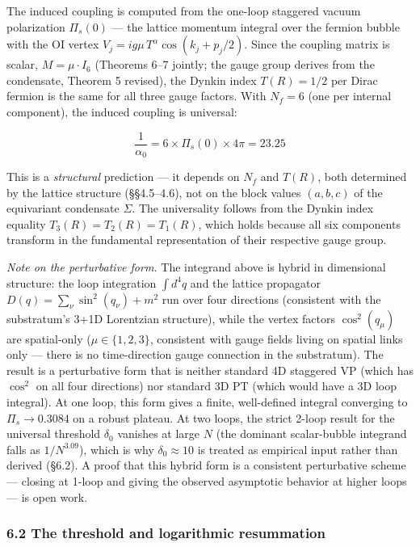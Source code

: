 \documentclass[
]{article}
\begin{document}
The induced coupling is computed from the one-loop staggered vacuum
polarization \(\Pi_s(0)\) --- the lattice momentum integral over the
fermion bubble with the OI vertex
\(V_j = i g \mu \, T^\alpha \cos(k_j + p_j/2)\). Since the coupling
matrix is scalar, \(M = \mu \cdot I_6\) (Theorems 6--7 jointly; the
gauge group derives from the condensate, Theorem 5 revised), the Dynkin
index \(T(R) = 1/2\) per Dirac fermion is the same for all three gauge
factors. With \(N_f = 6\) (one per internal component), the induced
coupling is universal:

\[\frac{1}{\alpha_0} = 6 \times \Pi_s(0) \times 4\pi = 23.25\]

This is a \emph{structural} prediction --- it depends on \(N_f\) and
\(T(R)\), both determined by the lattice structure (§§4.5--4.6), not on
the block values \((a, b, c)\) of the equivariant condensate \(\Sigma\).
The universality follows from the Dynkin index equality
\(T_3(R) = T_2(R) = T_1(R)\), which holds because all six components
transform in the fundamental representation of their respective gauge
group.

\emph{Note on the perturbative form.} The integrand above is hybrid in
dimensional structure: the loop integration \(\int d^4q\) and the
lattice propagator \(D(q) = \sum_\nu \sin^2(q_\nu) + m^2\) run over four
directions (consistent with the substratum's 3+1D Lorentzian structure),
while the vertex factors \(\cos^2(q_\mu)\) are spatial-only
(\(\mu \in \{1,2,3\}\), consistent with gauge fields living on spatial
links only --- there is no time-direction gauge connection in the
substratum). The result is a perturbative form that is neither standard
4D staggered VP (which has \(\cos^2\) on all four directions) nor
standard 3D PT (which would have a 3D loop integral). At one loop, this
form gives a finite, well-defined integral converging to
\(\Pi_s \to 0.3084\) on a robust plateau. At two loops, the strict
2-loop result for the universal threshold \(\delta_0\) vanishes at large
\(N\) (the dominant scalar-bubble integrand falls as \(1/N^{3.09}\)),
which is why \(\delta_0 \approx 10\) is treated as empirical input
rather than derived (§6.2). A proof that this hybrid form is a
consistent perturbative scheme --- closing at 1-loop and giving the
observed asymptotic behavior at higher loops --- is open work.

\hypertarget{the-threshold-and-logarithmic-resummation}{%
\subsubsection{6.2 The threshold and logarithmic
resummation}\label{the-threshold-and-logarithmic-resummation}}
\end{document}
